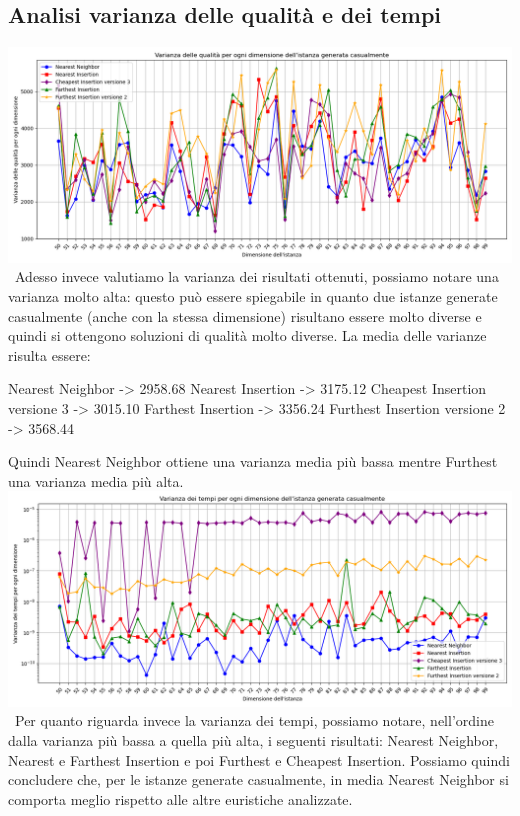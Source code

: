 \documentclass[a4paper,12pt]{report}
\begin{document}
\subsection{Analisi varianza delle qualità e dei tempi}
\includegraphics[width=1\textwidth]{../Grafici/22.png} \
Adesso invece valutiamo la varianza dei risultati ottenuti, possiamo notare una varianza molto alta: questo può essere spiegabile in quanto due istanze generate casualmente (anche con la stessa dimensione) risultano essere molto diverse e quindi si ottengono soluzioni di qualità molto diverse. La media delle varianze risulta essere:
\begin{myverbatim}
Nearest Neighbor ->              2958.68
Nearest Insertion ->             3175.12
Cheapest Insertion versione 3 -> 3015.10
Farthest Insertion ->            3356.24
Furthest Insertion versione 2 -> 3568.44
\end{myverbatim}
Quindi Nearest Neighbor ottiene una varianza media più bassa mentre Furthest una varianza media più alta. \newline
\includegraphics[width=1\textwidth]{../Grafici/23.png} \
Per quanto riguarda invece la varianza dei tempi, possiamo notare, nell'ordine dalla varianza più bassa a quella più alta, i seguenti risultati: Nearest Neighbor, Nearest e Farthest Insertion e poi Furthest e Cheapest Insertion. \newline
Possiamo quindi concludere che, per le istanze generate casualmente, in media Nearest Neighbor si comporta meglio rispetto alle altre euristiche analizzate.
\end{document}
